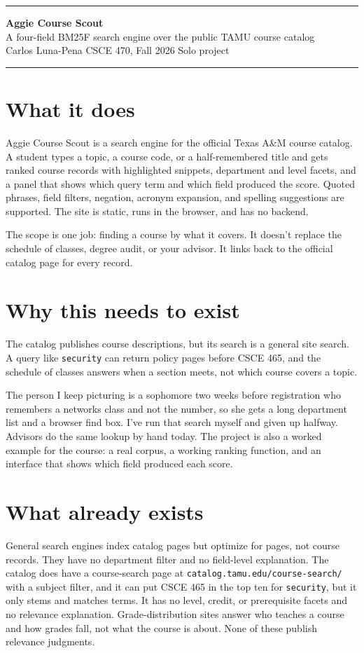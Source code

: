 \documentclass[10pt]{article}
\begin{document}
{\color{maroon}\rule{\linewidth}{4pt}}
\begin{center}
{\Large\bfseries\color{maroon} Aggie Course Scout}\\[2pt]
{\large A four-field BM25F search engine over the public TAMU course catalog}\\[5pt]
Carlos Luna-Pena \quad CSCE 470, Fall 2026 \quad Solo project
\end{center}
{\color{maroon}\rule{\linewidth}{1pt}}

\section*{What it does}
Aggie Course Scout is a search engine for the official Texas A\&M course catalog. A student types a topic, a course code, or a half-remembered title and gets ranked course records with highlighted snippets, department and level facets, and a panel that shows which query term and which field produced the score. Quoted phrases, field filters, negation, acronym expansion, and spelling suggestions are supported. The site is static, runs in the browser, and has no backend.

The scope is one job: finding a course by what it covers. It doesn't replace the schedule of classes, degree audit, or your advisor. It links back to the official catalog page for every record.

\section*{Why this needs to exist}
The catalog publishes course descriptions, but its search is a general site search. A query like \texttt{security} can return policy pages before CSCE 465, and the schedule of classes answers when a section meets, not which course covers a topic.

The person I keep picturing is a sophomore two weeks before registration who remembers a networks class and not the number, so she gets a long department list and a browser find box. I've run that search myself and given up halfway. Advisors do the same lookup by hand today. The project is also a worked example for the course: a real corpus, a working ranking function, and an interface that shows which field produced each score.

\section*{What already exists}
General search engines index catalog pages but optimize for pages, not course records. They have no department filter and no field-level explanation. The catalog does have a course-search page at \texttt{catalog.tamu.edu/course-search/} with a subject filter, and it can put CSCE 465 in the top ten for \texttt{security}, but it only stems and matches terms. It has no level, credit, or prerequisite facets and no relevance explanation. Grade-distribution sites answer who teaches a course and how grades fall, not what the course is about. None of these publish relevance judgments.
\end{document}
